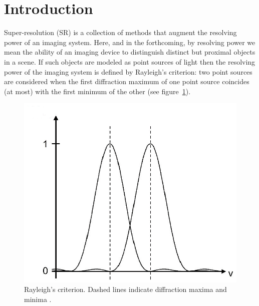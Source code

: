 \section{Introduction}\label{sec:introduction}

Super-resolution (SR) is a collection of methods that augment the resolving power of an imaging system.
%
Here, and in the forthcoming, by resolving power we mean the ability of an imaging device to distinguish distinct but proximal objects in a scene.
%
If such objects are modeled as point sources of light then the resolving power of the imaging system is defined by Rayleigh's criterion: two point sources are considered  when the first diffraction maximum of one point source coincides (at most) with the first minimum of the other (see figure~\ref{fig:rayleigh}).
\begin{figure}[!htbp]
	\center
	\includegraphics[width=\linewidth,keepaspectratio]{figures/classical/rayleigh.png}
	\caption{Rayleigh's criterion. Dashed lines indicate diffraction maxima and minima \cite{rayleigh}.}
	\label{fig:rayleigh}
\end{figure}

